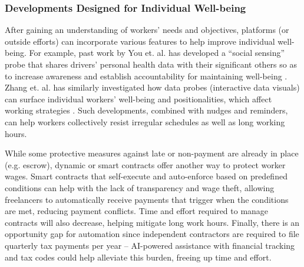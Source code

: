 \subsubsection{Developments Designed for Individual Well-being}
After gaining an understanding of workers' needs and objectives, platforms (or outside efforts) can incorporate various features to help improve individual well-being. For example, past work by You et. al. has developed a ``social sensing'' probe that shares drivers' personal health data with their significant others so as to increase awareness and establish accountability for maintaining well-being \cite{you2021go}. Zhang et. al. has similarly investigated how data probes (interactive data visuals) can surface individual workers' well-being and positionalities, which affect working strategies \cite{zhang2023stakeholder}.
Such developments, combined with nudges and reminders, can help workers collectively resist irregular schedules as well as long working hours. 

While some protective measures against late or non-payment are already in place (e.g. escrow), dynamic or smart contracts offer another way to protect worker wages. Smart contracts that self-execute and auto-enforce based on predefined conditions can help with the lack of transparency and wage theft, allowing freelancers to automatically receive payments that trigger when the conditions are met, reducing payment conflicts. Time and effort required to manage contracts will also decrease, helping mitigate long work hours. Finally, there is an opportunity gap for automation since independent contractors are required to file quarterly tax payments per year -- AI-powered assistance with financial tracking and tax codes could help alleviate this burden, freeing up time and effort.


